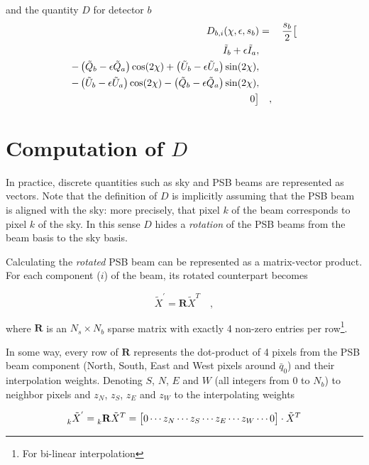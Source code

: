 \documentclass[11pt]{article}
\begin{document}
\noindent
and the quantity $D$ for detector $b$
\begin{equation}
	\begin{aligned}
		D_{b, i}(\chi, \epsilon, s_b) &=& \frac{s_b}{2} \big{[} \\
		\tilde{I}_{b} + \epsilon \tilde{I}_{a} , \\
		-\left(\tilde{Q}_{b} - \epsilon \tilde{Q}_{a} \right) \cos(2 \chi) + \left(\tilde{U}_{b} - \epsilon \tilde{U}_{a} \right) \sin(2 \chi) , \\
		-\left(\tilde{U}_{b} - \epsilon \tilde{U}_{a} \right) \cos(2 \chi) - \left(\tilde{Q}_{b} - \epsilon \tilde{Q}_{a} \right) \sin(2 \chi) , \\
		0 \big{]} & \quad ,
	\end{aligned}
\end{equation}

\section{Computation of $D$}

In practice, discrete quantities such as sky and PSB beams are represented as vectors. Note that the definition of $D$ is implicitly assuming that 
the PSB beam is aligned with the sky: more precisely, that pixel $k$ of the beam corresponds to pixel $k$ of the sky. In this sense $D$ hides a \textsl{rotation}
of the PSB beams from the beam basis to the sky basis. 

Calculating the \textsl{rotated} PSB beam can be represented as a matrix-vector product. For each component ($i$) of the beam, its rotated counterpart becomes

\begin{equation}
	\tilde{X}^{'} = \mathbf{R} \tilde{X}^{T} \quad ,
\end{equation}

\noindent
where $\mathbf{R}$ is an $N_s \times N_b$ sparse matrix with exactly 4 non-zero entries per row\footnote{For bi-linear interpolation}.

In some way, every row of $\mathbf{R}$ represents the dot-product of 4 pixels from the PSB beam component (North, South, East and West pixels around $\bar{q}_{0}$) 
and their interpolation weights. Denoting $S$, $N$, $E$ and $W$ (all integers from $0$ to $N_b$) to neighbor pixels and $z_N$, $z_S$, $z_E$ and $z_W$ to
the interpolating weights

\begin{equation}
	\prescript{}{k}{ \tilde{X}^{'} } = \prescript{}{k}{ \mathbf{R} } \tilde{X}^{T} = \big{[} 0 \cdots z_N \cdots z_S \cdots z_E \cdots z_W \cdots 0 \big{]} \cdot \tilde{X}^{T}
\end{equation}
\end{document}
